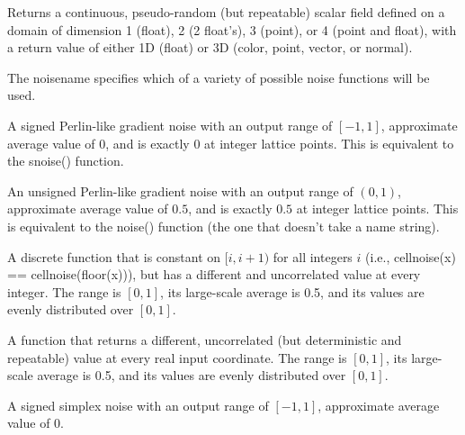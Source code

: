 \documentclass[11pt,letterpaper]{book}
\def\color{{\cf color}\xspace}
\def\float{{\cf float}\xspace}
\def\normal{{\cf normal}\xspace}
\def\point{{\cf point}\xspace}
\def\vector{{\cf vector}\xspace}
\begin{document}

Returns a continuous, pseudo-random (but repeatable) scalar field
defined on a domain of dimension 1 (\float), 2 (2 \float's), 3 (\point),
or 4 (\point and \float), with a return value of either 1D (\float) or 3D
(\color, \point, \vector, or \normal).

The {\cf noisename} specifies which of a variety of possible noise
functions will be used.  

\vspace{12pt}

A signed Perlin-like gradient noise with an output range of $[-1,1]$,
approximate average value of $0$, and is exactly $0$ at integer lattice
points.  This is equivalent to the {\cf snoise()} function.

\apiend
\vspace{-16pt}

\vspace{12pt}
An unsigned Perlin-like gradient noise with an output range of $(0,1)$,
approximate average value of $0.5$, and is exactly $0.5$ at integer
lattice points.  This is equivalent to the {\cf noise()} function (the
one that doesn't take a name string).
\apiend
\vspace{-16pt}

\vspace{12pt}
A discrete function that is constant on $[i,i+1)$ for all integers $i$
(i.e., {\cf cellnoise(x) == cellnoise(floor(x))}), but has a different
and uncorrelated value at every integer.  The range is $[0,1]$, its
large-scale average is 0.5, and its values are evenly distributed over
$[0,1]$.
\apiend

\vspace{12pt}
A function that returns a different, uncorrelated (but deterministic and
repeatable) value at every real input coordinate.  The range is $[0,1]$, its
large-scale average is 0.5, and its values are evenly distributed over
$[0,1]$.
\apiend

\vspace{12pt}
A signed simplex noise with an output range of $[-1,1]$,
approximate average value of $0$.
\apiend
\end{document}
